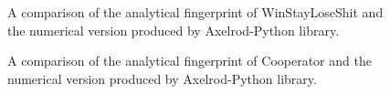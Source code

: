\begin{figure}[htbp!]
\caption{A comparison of the analytical fingerprint of WinStayLoseShit and the numerical version produced by Axelrod-Python library.}
\label{fig:WSLS-comparison}
\end{figure}
\begin{figure}[htbp!]
\caption{A comparison of the analytical fingerprint of Cooperator and the numerical version produced by Axelrod-Python library.}
\label{fig:Cooperator-comparison}
\end{figure}
